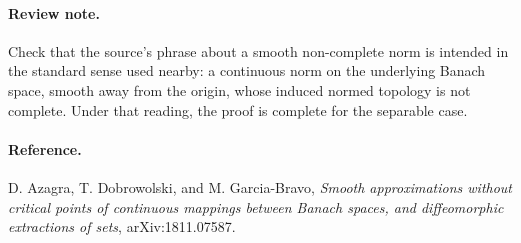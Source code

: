 \documentclass[11pt]{article}
\begin{document}
\paragraph{Review note.}
Check that the source's phrase about a smooth non-complete norm is intended
in the standard sense used nearby: a continuous norm on the underlying
Banach space, smooth away from the origin, whose induced normed topology is
not complete.  Under that reading, the proof is complete for the separable
case.

\paragraph{Reference.}
D. Azagra, T. Dobrowolski, and M. Garcia-Bravo,
\emph{Smooth approximations without critical points of continuous mappings
between Banach spaces, and diffeomorphic extractions of sets},
arXiv:1811.07587.
\end{document}
